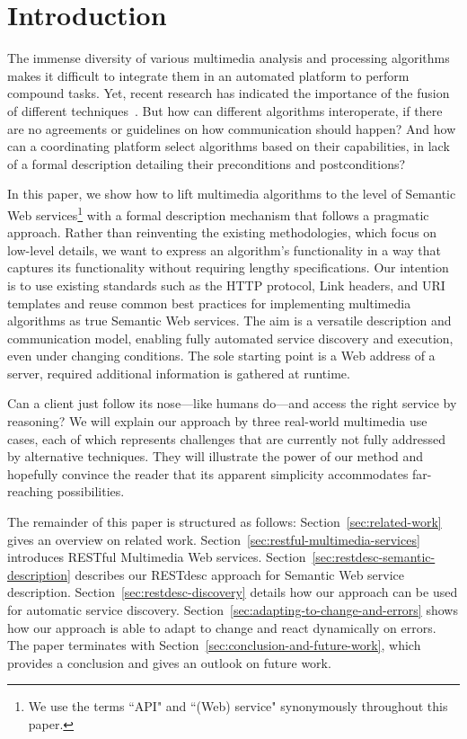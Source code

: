 \documentclass[runningheads,a4paper, twocolumn]{llncs}
\begin{document}

\section{Introduction} \label{sec:introduction}
The immense diversity of various multimedia analysis and processing algorithms makes it difficult to integrate them in an automated platform to perform compound tasks. Yet, recent research has indicated the importance of the fusion of different techniques~\cite{Atrey:2010p3072}. But how can different algorithms interoperate, if there are no agreements or guidelines on how communication should happen? And how can a coordinating platform select algorithms based on their capabilities, in lack of a formal description detailing their preconditions and postconditions?

In this paper, we show how to lift multimedia algorithms to the level of Semantic Web services\footnote{We use the terms ``API" and ``(Web) service" synonymously throughout this paper.} with a formal description mechanism that follows a pragmatic approach. Rather than reinventing the existing methodologies, which focus on low-level details, we want to express an algorithm's functionality in a way that captures its functionality without requiring lengthy specifications. Our intention is to use existing standards such as the HTTP protocol, Link headers, and URI templates and reuse common best practices for implementing multimedia algorithms as true Semantic Web services. The aim is a versatile description and communication model, enabling fully automated service discovery and execution, even under changing conditions. The sole starting point is a Web address of a server, required additional information is gathered at runtime.

Can a client just follow its nose---like humans do---and access the right service by reasoning? We will explain our approach by three real-world multimedia use cases, each of which represents challenges that are currently not fully addressed by alternative techniques. They will illustrate the power of our method and hopefully convince the reader that its apparent simplicity accommodates far-reaching possibilities.

The remainder of this paper is structured as follows: Section~\ref{sec:related-work} gives an overview on related work. Section~\ref{sec:restful-multimedia-services} introduces RESTful Multimedia Web services. Section~\ref{sec:restdesc-semantic-description} describes our RESTdesc approach for Semantic Web service description. Section~\ref{sec:restdesc-discovery} details how our approach can be used for automatic service discovery. Section~\ref{sec:adapting-to-change-and-errors} shows how our approach is able to adapt to change and react dynamically on errors. The paper terminates with Section~\ref{sec:conclusion-and-future-work}, which provides a conclusion and gives an outlook on future work.
\end{document}
